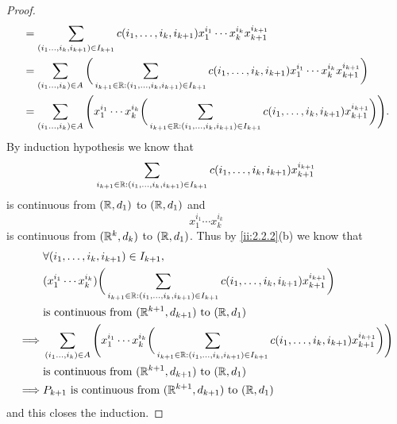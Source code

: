 \begin{proof}
\begin{align*}
     & = \sum_{(i_1 \dots, i_k, i_{k + 1}) \in I_{k + 1}} c(i_1, \dots, i_k, i_{k + 1}) x_1^{i_1} \cdots x_k^{i_k} x_{k + 1}^{i_{k + 1}}                                                                            \\
     & = \sum_{(i_1 \dots, i_k) \in A} \bigg(\sum_{i_{k + 1} \in \mathbb{R} : (i_1, \dots, i_k, i_{k + 1}) \in I_{k + 1}} c(i_1, \dots, i_k, i_{k + 1}) x_1^{i_1} \cdots x_k^{i_k} x_{k + 1}^{i_{k + 1}}\bigg)              \\
     & = \sum_{(i_1 \dots, i_k) \in A} \Bigg(x_1^{i_1} \cdots x_k^{i_k} \bigg(\sum_{i_{k + 1} \in \mathbb{R} : (i_1, \dots, i_k, i_{k + 1}) \in I_{k + 1}} c(i_1, \dots, i_k, i_{k + 1}) x_{k + 1}^{i_{k + 1}}\bigg)\Bigg).
  \end{align*}
  By induction hypothesis we know that
  \[
    \sum_{i_{k + 1} \in \mathbb{R} : (i_1, \dots, i_k, i_{k + 1}) \in I_{k + 1}} c(i_1, \dots, i_k, i_{k + 1}) x_{k + 1}^{i_{k + 1}}
  \]
  is continuous from \((\mathbb{R}, d_1)\) to \((\mathbb{R}, d_1)\) and
  \[
    x_1^{i_1} \cdots x_k^{i_k}
  \]
  is continuous from \((\mathbb{R}^k, d_k)\) to \((\mathbb{R}, d_1)\).
  Thus by \cref{ii:2.2.2}(b) we know that
  \begin{align*}
             & \forall (i_1, \dots, i_k, i_{k + 1}) \in I_{k + 1},                                                                                                                                                       \\
             & (x_1^{i_1} \cdots x_k^{i_k}) \bigg(\sum_{i_{k + 1} \in \mathbb{R} : (i_1, \dots, i_k, i_{k + 1}) \in I_{k + 1}} c(i_1, \dots, i_k, i_{k + 1}) x_{k + 1}^{i_{k + 1}}\bigg)                                         \\
             & \text{is continuous from } (\mathbb{R}^{k + 1}, d_{k + 1}) \text{ to } (\mathbb{R}, d_1)                                                                                                                                  \\
    \implies & \sum_{(i_1 \dots, i_k) \in A} \Bigg(x_1^{i_1} \cdots x_k^{i_k} \bigg(\sum_{i_{k + 1} \in \mathbb{R} : (i_1, \dots, i_k, i_{k + 1}) \in I_{k + 1}} c(i_1, \dots, i_k, i_{k + 1}) x_{k + 1}^{i_{k + 1}}\bigg)\Bigg) \\
             & \text{is continuous from } (\mathbb{R}^{k + 1}, d_{k + 1}) \text{ to } (\mathbb{R}, d_1)                                                                                                                                  \\
    \implies & P_{k + 1} \text{ is continuous from } (\mathbb{R}^{k + 1}, d_{k + 1}) \text{ to } (\mathbb{R}, d_1)
  \end{align*}
  and this closes the induction.
\end{proof}

